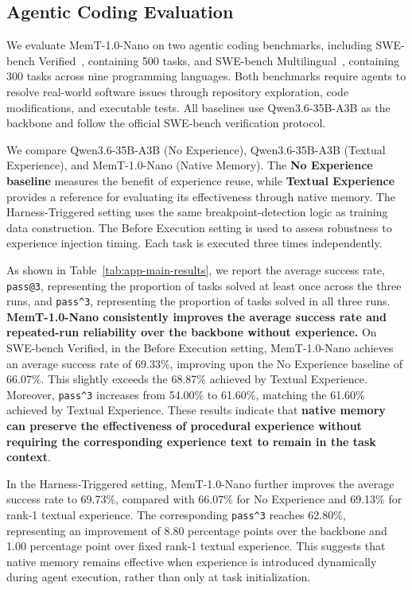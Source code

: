 \subsection{Agentic Coding Evaluation}
\label{sec:app-evaluation}

We evaluate MemT-1.0-Nano on two agentic coding benchmarks, including SWE-bench Verified~\cite{chowdhury2024swebenchverified}, containing 500 tasks, and SWE-bench Multilingual~\cite{Yang2025SWEsmithSD}, containing 300 tasks across nine programming languages. Both benchmarks require agents to resolve real-world software issues through repository exploration, code modifications, and executable tests. All baselines use Qwen3.6-35B-A3B as the backbone and follow the official SWE-bench verification protocol.

We compare Qwen3.6-35B-A3B (No Experience), Qwen3.6-35B-A3B (Textual Experience), and MemT-1.0-Nano (Native Memory). The \textbf{No Experience baseline} measures the benefit of experience reuse, while \textbf{Textual Experience} provides a reference for evaluating its effectiveness through native memory. The Harness-Triggered setting uses the same breakpoint-detection logic as training data construction. The Before Execution setting is used to assess robustness to experience injection timing. Each task is executed three times independently.

As shown in Table~\ref{tab:app-main-results}, we report the average success rate, \texttt{pass@3}, representing the proportion of tasks solved at least once across the three runs, and \texttt{pass\textasciicircum{}3}, representing the proportion of tasks solved in all three runs.
\textbf{MemT-1.0-Nano consistently improves the average success rate and repeated-run reliability over the backbone without experience.} On SWE-bench Verified, in the Before Execution setting, MemT-1.0-Nano achieves an average success rate of 69.33\%, improving upon the No Experience baseline of 66.07\%. This slightly exceeds the 68.87\% achieved by Textual Experience. Moreover, \texttt{pass\textasciicircum{}3} increases from 54.00\% to 61.60\%, matching the 61.60\% achieved by Textual Experience. These results indicate that \textbf{native memory can preserve the effectiveness of procedural experience without requiring the corresponding experience text to remain in the task context}.





In the Harness-Triggered setting, MemT-1.0-Nano further improves the average success rate to 69.73\%, compared with 66.07\% for No Experience and 69.13\% for rank-1 textual experience. The corresponding \texttt{pass\textasciicircum{}3} reaches 62.80\%, representing an improvement of 8.80 percentage points over the backbone and 1.00 percentage point over fixed rank-1 textual experience. This suggests that native memory remains effective when experience is introduced dynamically during agent execution, rather than only at task initialization.

